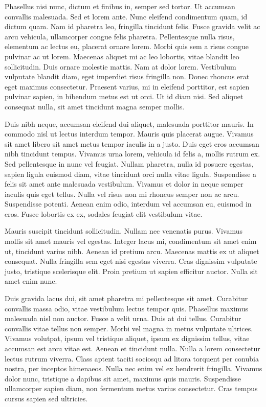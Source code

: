 Phasellus nisi nunc, dictum et finibus in, semper sed tortor. Ut accumsan convallis malesuada. Sed et lorem ante. Nunc eleifend condimentum quam, id dictum quam. Nam id pharetra leo, fringilla tincidunt felis. Fusce gravida velit ac arcu vehicula, ullamcorper congue felis pharetra. Pellentesque nulla risus, elementum ac lectus eu, placerat ornare lorem. Morbi quis sem a risus congue pulvinar ac ut lorem. Maecenas aliquet mi ac leo lobortis, vitae blandit leo sollicitudin. Duis ornare molestie mattis. Nam at dolor lorem. Vestibulum vulputate blandit diam, eget imperdiet risus fringilla non. Donec rhoncus erat eget maximus consectetur. Praesent varius, mi in eleifend porttitor, est sapien pulvinar sapien, in bibendum metus est ut orci. Ut id diam nisi. Sed aliquet consequat nulla, sit amet tincidunt magna semper mollis.

Duis nibh neque, accumsan eleifend dui aliquet, malesuada porttitor mauris. In commodo nisl ut lectus interdum tempor. Mauris quis placerat augue. Vivamus sit amet libero sit amet metus tempor iaculis in a justo. Duis eget eros accumsan nibh tincidunt tempus. Vivamus urna lorem, vehicula id felis a, mollis rutrum ex. Sed pellentesque in nunc vel feugiat. Nullam pharetra, nulla id posuere egestas, sapien ligula euismod diam, vitae tincidunt orci nulla vitae ligula. Suspendisse a felis sit amet ante malesuada vestibulum. Vivamus et dolor in neque semper iaculis quis eget tellus. Nulla vel risus non mi rhoncus semper non ac arcu. Suspendisse potenti. Aenean enim odio, interdum vel accumsan eu, euismod in eros. Fusce lobortis ex ex, sodales feugiat elit vestibulum vitae.

Mauris suscipit tincidunt sollicitudin. Nullam nec venenatis purus. Vivamus mollis sit amet mauris vel egestas. Integer lacus mi, condimentum sit amet enim ut, tincidunt varius nibh. Aenean id pretium arcu. Maecenas mattis ex ut aliquet consequat. Nulla fringilla sem eget nisi egestas viverra. Cras dignissim vulputate justo, tristique scelerisque elit. Proin pretium ut sapien efficitur auctor. Nulla sit amet enim nunc.

Duis gravida lacus dui, sit amet pharetra mi pellentesque sit amet. Curabitur convallis massa odio, vitae vestibulum lectus tempor quis. Phasellus maximus malesuada nisl non auctor. Fusce a velit urna. Duis at dui tellus. Curabitur convallis vitae tellus non semper. Morbi vel magna in metus vulputate ultrices. Vivamus volutpat, ipsum vel tristique aliquet, ipsum ex dignissim tellus, vitae accumsan est arcu vitae est. Aenean et tincidunt nulla. Nulla a lorem consectetur lectus rutrum viverra. Class aptent taciti sociosqu ad litora torquent per conubia nostra, per inceptos himenaeos. Nulla nec enim vel ex hendrerit fringilla. Vivamus dolor nunc, tristique a dapibus sit amet, maximus quis mauris. Suspendisse ullamcorper sapien diam, non fermentum metus varius consectetur. Cras tempus cursus sapien sed ultricies.

